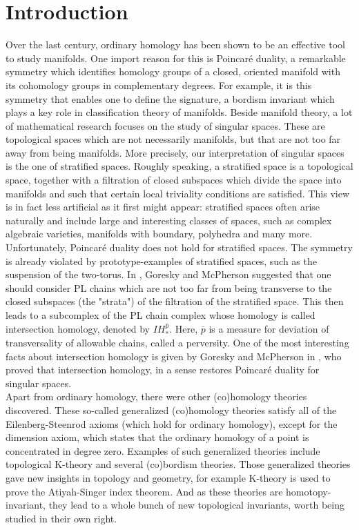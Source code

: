 \documentclass{scrreprt}
\begin{document}
\newpage

\tableofcontents

\chapter{Introduction}

Over the last century, ordinary homology has been shown to be an effective tool to study manifolds. One import reason for this is Poincar\'{e} duality, a remarkable symmetry which identifies homology groups of a closed, oriented manifold with its cohomology groups in complementary degrees. For example, it is this symmetry that enables one to define the signature, a bordism invariant which plays a key role in classification theory of manifolds. Beside manifold theory, a lot of mathematical research focuses on the study of singular spaces. These are topological spaces which are not necessarily manifolds, but that are not too far away from being manifolds. More precisely, our interpretation of singular spaces is the one of stratified spaces. Roughly speaking, a stratified space is a topological space, together with a filtration of closed subspaces which divide the space into manifolds and such that certain local triviality conditions are satisfied. This view is in fact less artificial as it first might appear: stratified spaces often arise naturally and include large and interesting classes of spaces, such as complex algebraic varieties, manifolds with boundary, polyhedra and many more. \\
Unfortunately, Poincar\'{e} duality does not hold for stratified spaces. The symmetry is already violated by prototype-examples of stratified spaces, such as the suspension of the two-torus. In \cite{GM}, Goresky and McPherson suggested that one should consider PL chains which are not too far from being transverse to the closed subspaces (the "strata") of the filtration of the stratified space. This then leads to a subcomplex of the PL chain complex whose homology is called intersection homology, denoted by $IH_*^{\overline{p}}$. Here, $\overline{p}$ is a measure for deviation of transversality of allowable chains, called a perversity. One of the most interesting facts about intersection homology is given by Goresky and McPherson in \cite{GM}, who proved that intersection homology, in a sense restores Poincar\'{e} duality for singular spaces. \\
Apart from ordinary homology, there were other (co)homology theories discovered. These so-called generalized (co)homology theories satisfy all of the Eilenberg-Steenrod axioms (which hold for ordinary homology), except for the dimension axiom, which states that the ordinary homology of a point is concentrated in degree zero. Examples of such generalized theories include topological K-theory and several (co)bordism theories. Those generalized theories gave new insights in topology and geometry, for example K-theory is used to prove the Atiyah-Singer index theorem. And as these theories are homotopy-invariant, they lead to a whole bunch of new topological invariants, worth being studied in their own right. \\
\end{document}
